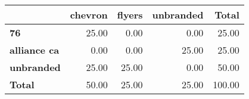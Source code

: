 \begin{tabular}{lrrrr}
\toprule
 & \textbf{chevron} & \textbf{flyers} & \textbf{unbranded} & \textbf{Total} \\
\midrule
\textbf{76} & 25.00 & 0.00 & 0.00 & 25.00 \\
\textbf{alliance ca} & 0.00 & 0.00 & 25.00 & 25.00 \\
\textbf{unbranded} & 25.00 & 25.00 & 0.00 & 50.00 \\
\textbf{Total} & 50.00 & 25.00 & 25.00 & 100.00 \\
\bottomrule
\end{tabular}
